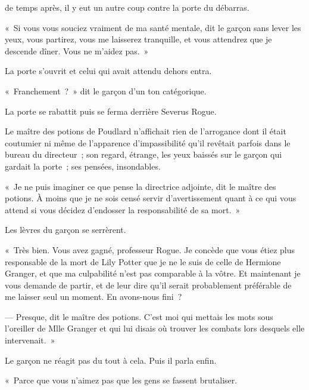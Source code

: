 
 de temps après, il y eut un autre coup contre la porte du débarras.

\hplettrineextrapara
«~Si vous vous souciez vraiment de ma santé mentale, dit le garçon sans lever les yeux, vous partirez, vous me laisserez tranquille, et vous attendrez que je descende dîner. Vous ne m'aidez pas.~»

La porte s'ouvrit et celui qui avait attendu dehors entra.

«~Franchement~?~» dit le garçon d'un ton catégorique.

La porte se rabattit puis se ferma derrière Severus Rogue.

Le maître des potions de Poudlard n'affichait rien de l'arrogance dont il était coutumier ni même de l'apparence d'impassibilité qu'il revêtait parfois dans le bureau du directeur~; son regard, étrange, les yeux baissés sur le garçon qui gardait la porte~; ses pensées, insondables.

«~Je ne puis imaginer ce que pense la directrice adjointe, dit le maître des potions. À moins que je ne sois censé servir d'avertissement quant à ce qui vous attend si vous décidez d'endosser la responsabilité de sa mort.~»

Les lèvres du garçon se serrèrent.

«~Très bien. Vous avez gagné, professeur Rogue. Je concède que vous étiez plus responsable de la mort de Lily Potter que je ne le suis de celle de Hermione Granger, et que ma culpabilité n'est pas comparable à la vôtre. Et maintenant je vous demande de partir, et de leur dire qu'il serait probablement préférable de me laisser seul un moment. En avons-nous fini~?

--- Presque, dit le maître des potions. C'est moi qui mettais les mots sous l'oreiller de Mlle Granger et qui lui disais où trouver les combats lors desquels elle intervenait.~»

Le garçon ne réagit pas du tout à cela. Puis il parla enfin.

«~Parce que vous n'aimez pas que les gens se fassent brutaliser.

